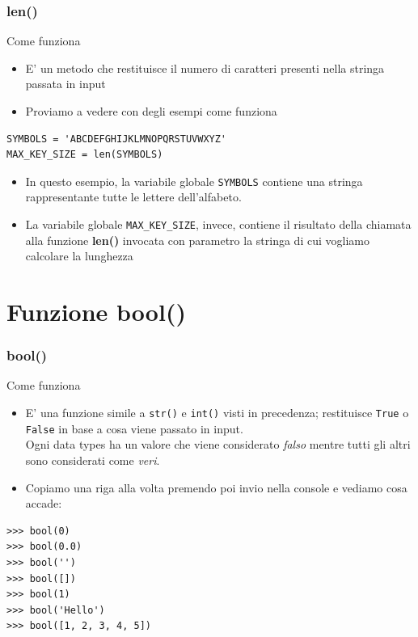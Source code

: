 \documentclass{beamer}
\begin{document}
\begin{frame}[fragile]
\frametitle{len()}
\begin{block}{Come funziona}
	\begin{itemize}
		\item E' un metodo che restituisce il numero di caratteri presenti nella stringa passata in input
		\item Proviamo a vedere con degli esempi come funziona
	\end{itemize}

	\begin{lstlisting}
SYMBOLS = 'ABCDEFGHIJKLMNOPQRSTUVWXYZ'
MAX_KEY_SIZE = len(SYMBOLS)
	\end{lstlisting}	
	\begin{itemize}
		\item In questo esempio, la variabile globale \texttt{SYMBOLS} contiene una stringa rappresentante tutte le lettere dell'alfabeto.
		\item La variabile globale \texttt{MAX\_KEY\_SIZE}, invece, contiene il risultato della chiamata alla funzione \textbf{len()} invocata con parametro la stringa di cui vogliamo calcolare la lunghezza
	\end{itemize}
\end{block}
\end{frame}

\section{Funzione bool()}

\begin{frame}[fragile]
\frametitle{bool()}
\begin{block}{Come funziona}
	\begin{itemize}
		\item E' una funzione simile a \texttt{str()} e \texttt{int()} visti in precedenza; restituisce \texttt{True} o \texttt{False} in base a cosa viene passato in input. \\ Ogni data types ha un valore che viene considerato \textit{falso} mentre tutti gli altri sono considerati come \textit{veri}.
		\item Copiamo una riga alla volta premendo poi invio nella console e vediamo cosa accade:
	\end{itemize}
\end{block}
\begin{lstlisting}
>>> bool(0)
>>> bool(0.0)
>>> bool('')
>>> bool([])
>>> bool(1)
>>> bool('Hello')
>>> bool([1, 2, 3, 4, 5])
\end{lstlisting}
\end{frame}
\end{document}
